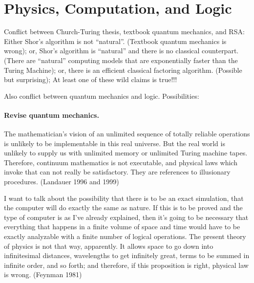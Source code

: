 \documentclass{article}
\newcommand{\jc}[1]{\fbox{Jacques says:} \textbf{#1}}
\begin{document}
\section{Physics, Computation, and Logic}

Conflict between Church-Turing thesis, textbook quantum mechanics, and
RSA: Either Shor's algorithm is not ``natural''. (Textbook quantum
mechanics is wrong); or, Shor's algorithm is ``natural'' and there is
no classical counterpart. (There are ``natural'' computing models that
are exponentially faster than the Turing Machine); or, there is an
efficient classical factoring algorithm. (Possible but surprising); At
least one of these wild claims is true!!!

\noindent Also conflict between quantum mechanics and logic. Possibilities:

\paragraph*{Revise quantum mechanics.}

The mathematician's vision of an unlimited sequence of totally
reliable operations is unlikely to be implementable in this real
universe.  But the real world is unlikely to supply us with unlimited
memory or unlimited Turing machine tapes. Therefore, continuum
mathematics is not executable, and physical laws which invoke that can
not really be satisfactory. They are references to illusionary
procedures.  (Landauer 1996 and 1999)


I want to talk about the possibility that there is to be an exact
simulation, that the computer will do exactly the same as nature. If
this is to be proved and the type of computer is as I've already
explained, then it's going to be necessary that everything that
happens in a finite volume of space and time would have to be exactly
analyzable with a finite number of logical operations. The present
theory of physics is not that way, apparently. It allows space to go
down into infinitesimal distances, wavelengths to get infinitely
great, terms to be summed in infinite order, and so forth; and
therefore, if this proposition is right, physical law is wrong.
(Feynman 1981)
\end{document}
